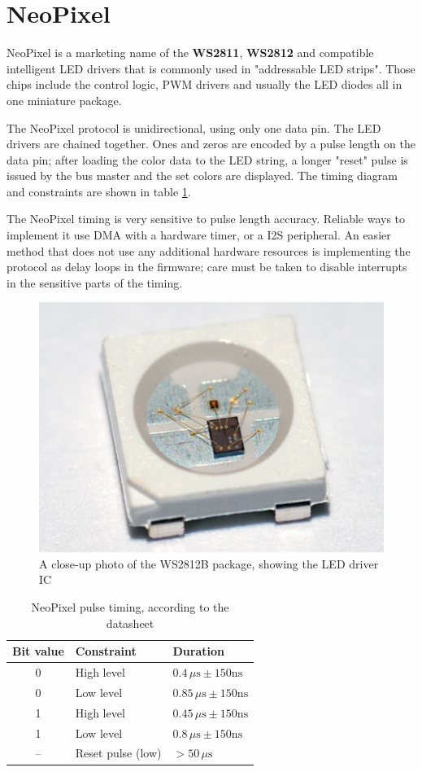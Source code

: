 \section{NeoPixel} \label{sec:theory-neo}

NeoPixel is a marketing name of the \textbf{WS2811}, \textbf{WS2812} and compatible intelligent LED drivers that is commonly used in "addressable LED strips". Those chips include the control logic, PWM drivers and usually the LED diodes all in one miniature package.

The NeoPixel protocol is unidirectional, using only one data pin. The LED drivers are chained together. Ones and zeros are encoded by a pulse length on the data pin; after loading the color data to the LED string, a longer "reset" pulse is issued by the bus master and the set colors are displayed. The timing diagram and constraints are shown in table \ref{fig:ws2812-dia}.

The NeoPixel timing is very sensitive to pulse length accuracy. Reliable ways to implement it use DMA with a hardware timer, or a I2S peripheral. An easier method that does not use any additional hardware resources is implementing the protocol as delay loops in the firmware; care must be taken to disable interrupts in the sensitive parts of the timing.

\begin{figure}[h]
	\centering
	\includegraphics[width=.5\textwidth] {img/ws2812b-detail.jpg}
	\caption{\label{fig:ws2812-detail}A close-up photo of the WS2812B package, showing the LED driver IC}
\end{figure}

\begin{table}[h]
	\centering
	\begin{tabular}{cll}
		\toprule
		\textbf{Bit value} & \textbf{Constraint} & \textbf{Duration} \\
		\midrule
		0 & High level & $0.4\,\mu\mathrm{s}\pm150\mathrm{ns}$ \\
		0 & Low level & $0.85\,\mu\mathrm{s}\pm150\mathrm{ns}$ \\
		1 & High level & $0.45\,\mu\mathrm{s}\pm150\mathrm{ns}$ \\
		1 & Low level & $0.8\,\mu\mathrm{s}\pm150\mathrm{ns}$ \\
		-- & Reset pulse (low) & $>50\,\mu\mathrm{s}$ \\
		\bottomrule
	\end{tabular}		
	\caption{\label{fig:ws2812-dia}NeoPixel pulse timing, according to the datasheet}
\end{table}




